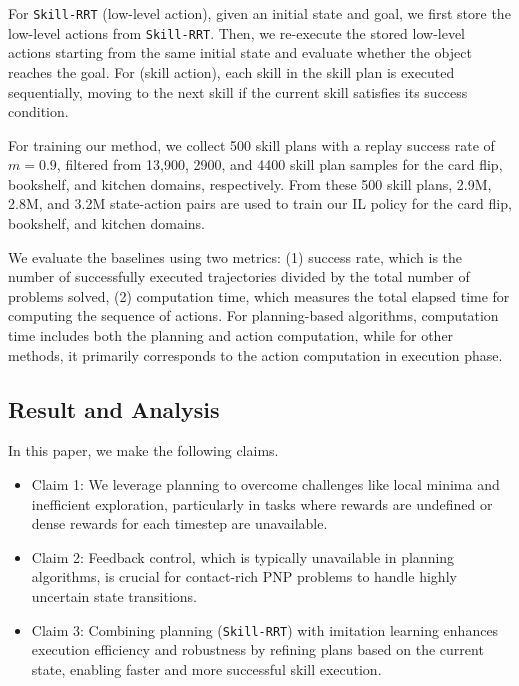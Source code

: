 For \texttt{Skill-RRT} (low-level action), given an initial state and goal, we first store the low-level actions from \texttt{Skill-RRT}. Then, we re-execute the stored low-level actions starting from the same initial state and evaluate whether the object reaches the goal.  For \skillrrt (skill action), each skill in the skill plan is executed sequentially, moving to the next skill if the current skill satisfies its success condition.

For training our method, we collect 500 skill plans with a replay success rate of \( m = 0.9 \), filtered from 13,900, 2900, and 4400 skill plan samples for the card flip, bookshelf, and kitchen domains, respectively. From these 500 skill plans, 2.9M, 2.8M, and 3.2M state-action pairs are used to train our IL policy for the card flip, bookshelf, and kitchen domains.

We evaluate the baselines using two metrics: (1) success rate, which is the number of successfully executed trajectories divided by the total number of problems solved, (2) computation time, which measures the total elapsed time for computing the sequence of actions. For planning-based algorithms, computation time includes both the planning and action computation, while for other methods, it primarily corresponds to the action computation in execution phase.

\subsection{Result and Analysis}


In this paper, we make the following claims.

\begin{itemize}
    \item Claim 1: We leverage planning to overcome challenges like local minima and inefficient exploration, particularly in tasks where rewards are undefined or dense rewards for each timestep are unavailable.
    \item Claim 2: Feedback control, which is typically unavailable in planning algorithms, is crucial for contact-rich PNP problems to handle highly uncertain state transitions.
    \item Claim 3: Combining planning (\texttt{Skill-RRT}) with
    imitation learning enhances execution efficiency and robustness by refining plans based on the current state, enabling faster and more successful skill execution.
\end{itemize}

